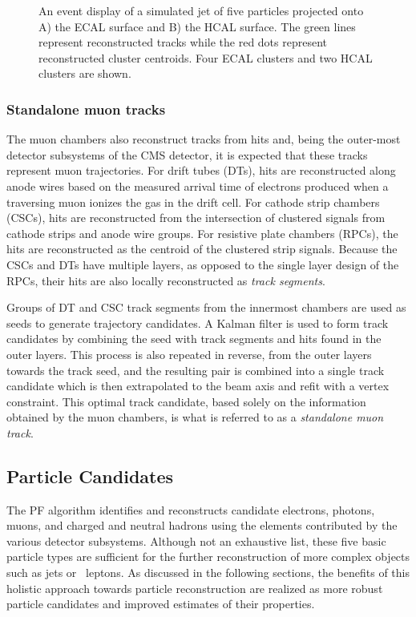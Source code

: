 \begin{figure}[htbp]
{  }
  \caption[Event Display of Calorimeter Clusters]{An event display of a simulated jet of five particles projected onto A) the ECAL surface and B) the HCAL surface. The green lines represent reconstructed tracks while the red dots represent reconstructed cluster centroids. Four ECAL clusters and two HCAL clusters are shown.\cite{PARTICLEFLOW}}
    \label{fig:caloclusters}
\end{figure}

\subsubsection{Standalone muon tracks}\label{standalonemuontrack}

The muon chambers also reconstruct tracks from hits and, being the outer-most detector subsystems of the CMS detector, it is expected that these tracks represent muon trajectories. For drift tubes (DTs), hits are reconstructed along anode wires based on the measured arrival time of electrons produced when a traversing muon ionizes the gas in the drift cell. For cathode strip chambers (CSCs), hits are reconstructed from the intersection of clustered signals from cathode strips and anode wire groups. For resistive plate chambers (RPCs), the hits are reconstructed as the centroid of the clustered strip signals. Because the CSCs and DTs have multiple layers, as opposed to the single layer design of the RPCs, their hits are also locally reconstructed as \textit{track segments}.

Groups of DT and CSC track segments from the innermost chambers are used as seeds to generate trajectory candidates. A Kalman filter\cite{MUONKF} is used to form track candidates by combining the seed with track segments and hits found in the outer layers. This process is also repeated in reverse, from the outer layers towards the track seed, and the resulting pair is combined into a single track candidate which is then extrapolated to the beam axis and refit with a vertex constraint. This optimal track candidate, based solely on the information obtained by the muon chambers, is what is referred to as a \textit{standalone muon track}.

\subsection{Particle Candidates}

The PF algorithm identifies and reconstructs candidate electrons, photons, muons, and charged and neutral hadrons using the elements contributed by the various detector subsystems. Although not an exhaustive list, these five basic particle types are sufficient for the further reconstruction of more complex objects such as jets or \lept\ leptons. As discussed in the following sections, the benefits of this holistic approach towards particle reconstruction are realized as more robust particle candidates and improved estimates of their properties.

